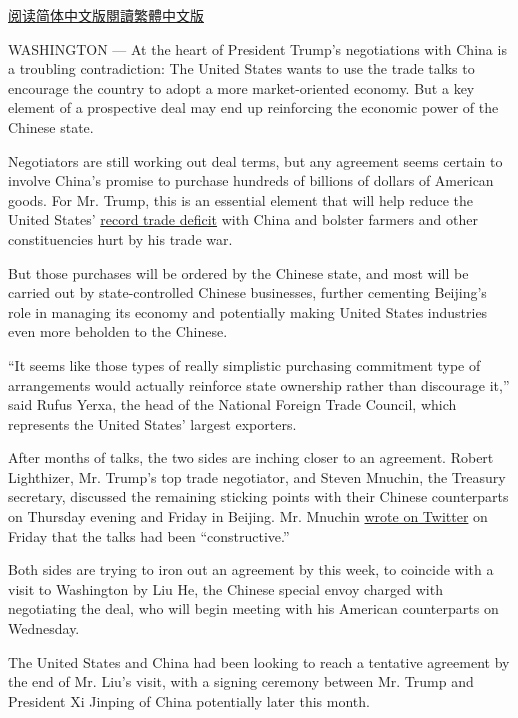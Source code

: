 \href{https://cn.nytimes.com/usa/20190401/us-china-trade-trump/}{阅读简体中文版}\href{https://cn.nytimes.com/usa/20190401/us-china-trade-trump/zh-hant/}{閱讀繁體中文版}

WASHINGTON --- At the heart of President Trump's negotiations with China
is a troubling contradiction: The United States wants to use the trade
talks to encourage the country to adopt a more market-oriented economy.
But a key element of a prospective deal may end up reinforcing the
economic power of the Chinese state.

Negotiators are still working out deal terms, but any agreement seems
certain to involve China's promise to purchase hundreds of billions of
dollars of American goods. For Mr. Trump, this is an essential element
that will help reduce the United States'
\href{https://www.nytimes.com/2019/03/06/us/politics/us-trade-deficit.html}{record
trade deficit} with China and bolster farmers and other constituencies
hurt by his trade war.

But those purchases will be ordered by the Chinese state, and most will
be carried out by state-controlled Chinese businesses, further cementing
Beijing's role in managing its economy and potentially making United
States industries even more beholden to the Chinese.

``It seems like those types of really simplistic purchasing commitment
type of arrangements would actually reinforce state ownership rather
than discourage it,'' said Rufus Yerxa, the head of the National Foreign
Trade Council, which represents the United States' largest exporters.

After months of talks, the two sides are inching closer to an agreement.
Robert Lighthizer, Mr. Trump's top trade negotiator, and Steven Mnuchin,
the Treasury secretary, discussed the remaining sticking points with
their Chinese counterparts on Thursday evening and Friday in Beijing.
Mr. Mnuchin
\href{https://twitter.com/stevenmnuchin1/status/1111534387328417792}{wrote
on Twitter} on Friday that the talks had been ``constructive.''

Both sides are trying to iron out an agreement by this week, to coincide
with a visit to Washington by Liu He, the Chinese special envoy charged
with negotiating the deal, who will begin meeting with his American
counterparts on Wednesday.

The United States and China had been looking to reach a tentative
agreement by the end of Mr. Liu's visit, with a signing ceremony between
Mr. Trump and President Xi Jinping of China potentially later this
month.

